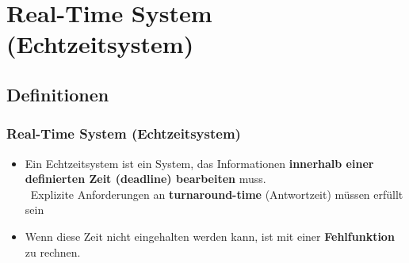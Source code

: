 \section{Real-Time System (Echtzeitsystem)}

\subsection{Definitionen}

\subsubsection{Real-Time System (Echtzeitsystem)}

\begin{itemize}
    \item Ein Echtzeitsystem ist ein System, das Informationen \textbf{innerhalb einer definierten Zeit (deadline) bearbeiten} muss. \\
        \textrightarrow\ Explizite Anforderungen an \textbf{turnaround-time} (Antwortzeit) müssen erfüllt sein
    \item Wenn diese Zeit nicht eingehalten werden kann, ist mit einer \textbf{Fehlfunktion} zu rechnen.
\end{itemize}

\vspace{0.2cm}

